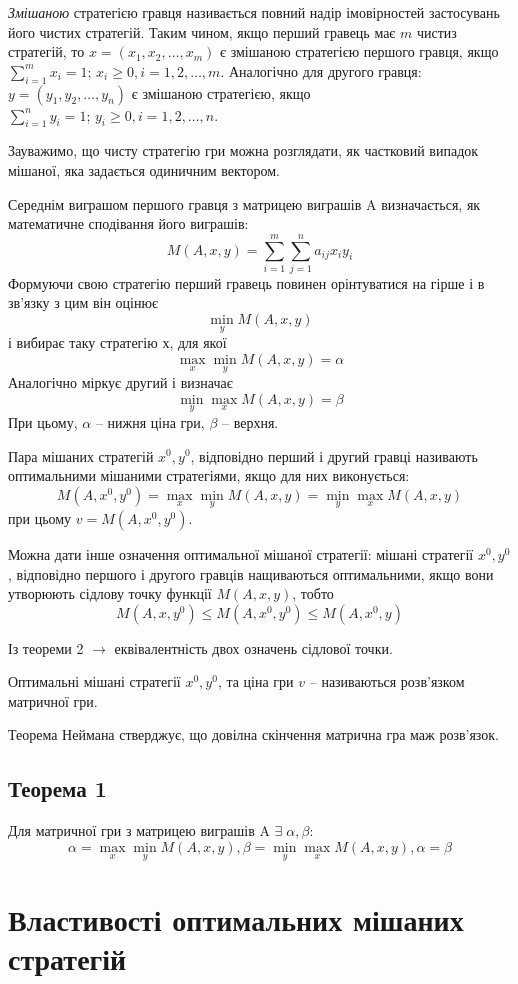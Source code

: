 \documentclass[12pt,a4paper]{book}
\begin{document}
\emph{Змішаною} стратегією гравця називається повний надір імовірностей застосувань його чистих стратегій. Таким чином, якщо перший гравець має $m$ чистиз стратегій, то $x=(x_1, x_2, \dots, x_m)$ є змішаною стратегією першого гравця, якщо $\sum_{i=1}^m x_i = 1; \, x_i \ge 0, i=1, 2, \dots, m$. Аналогічно для другого гравця: $y=(y_1, y_2, \dots, y_n)$ є змішаною стратегією, якщо$\sum_{i=1}^n y_i = 1; \, y_i \ge 0, i=1, 2, \dots, n$.

Зауважимо, що чисту стратегію гри можна розглядати, як частковий випадок мішаної, яка задається одиничним вектором.

Середнім виграшом першого гравця з матрицею виграшів A визначається, як математичне сподівання його виграшів:
\[
M(A, x, y)=\sum_{i=1}^m\sum_{j=1}^n a_{ij}x_i y_i
\]
Формуючи свою стратегію перший гравець повинен орінтуватися на гірше $і$ в зв'язку з цим він оцінює
\[\min_y M(A, x, y)\]
і вибирає таку стратегію $х$, для якої
\[\max_x\min_y M(A, x, y)=\alpha\]
Аналогічно міркує другий і визначає
\[\min_y\max_x M(A, x, y)=\beta\]
При цьому, $\alpha$ -- нижня ціна гри, $\beta$ -- верхня.

Пара мішаних стратегій $x^0, y^0$, відповідно перший і другий гравці називають оптимальними мішаними стратегіями, якщо для них виконується:
\[M(A, x^0, y^0)=\max_x\min_y M(A, x, y)=\min_y\max_x M(A, x, y)\]
при цьому $v = M(A, x^0, y^0)$.

Можна дати інше означення оптимальної мішаної стратегії: мішані стратегії $x^0, y^0$, відповідно першого і другого гравців нащиваються оптимальними, якщо вони утворюють сідлову точку функції $M(A, x, y)$, тобто
\[ M(A, x, y^0) \le M(A, x^0, y^0) \le M(A, x^0, y)\]

Із теореми 2 $\to$ еквівалентність двох означень сідлової точки.

Оптимальні мішані стратегії $x^0, y^0$, та ціна гри $v$ -- називаються розв'язком матричної гри.

Теорема Неймана стверджує, що довілна скінчення матрична гра маж розв'язок.

\subsection{Теорема 1}

Для матричної гри з матрицею виграшів A $\exists \; \alpha, \beta$:
\[\alpha = \max_x\min_y M(A, x, y), \beta=\min_y\max_x M(A, x, y), \alpha = \beta\]

\section{Властивості оптимальних мішаних стратегій}
\end{document}
